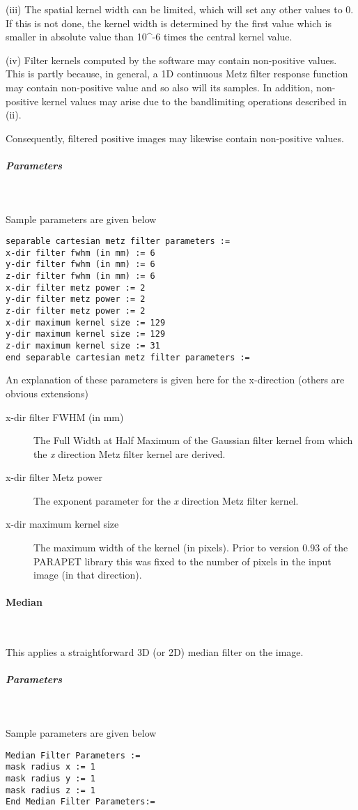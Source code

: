 \documentclass{article}
\newcommand{\subsubsubsection}[1]{\paragraph{#1}\mbox{} \\}
\newcommand{\subsubsubsubsection}[1]{\subparagraph{#1} \mbox{} \\}
\begin{document}
{(iii) The spatial kernel width can be limited, which will set 
any other values to 0. If this is not done, the kernel width 
is determined by the first value which is smaller in absolute 
value than 10{\textasciicircum}-6 times the central kernel value.



(iv) Filter kernels computed by the software may contain non-positive 
values. This is partly because, in general, a 1D continuous Metz 
filter response function may contain non-positive value and so 
also will its samples. In addition, non-positive kernel values 
may arise due to the bandlimiting operations described in (ii). 



Consequently, filtered positive images may likewise contain non-positive 
values. 

{ \subsubsubsubsection{Parameters}
}
Sample parameters are given below
\begin{verbatim}
separable cartesian metz filter parameters :=
x-dir filter fwhm (in mm) := 6
y-dir filter fwhm (in mm) := 6
z-dir filter fwhm (in mm) := 6
x-dir filter metz power := 2
y-dir filter metz power := 2
z-dir filter metz power := 2
x-dir maximum kernel size := 129
y-dir maximum kernel size := 129
z-dir maximum kernel size := 31
end separable cartesian metz filter parameters := 
\end{verbatim}


An explanation of these parameters is given here for the x-direction 
(others are obvious extensions)
\begin{description}
\item[x-dir filter FWHM (in mm)]
The Full Width at Half Maximum of the Gaussian filter kernel 
from which the \textit{x} direction Metz filter kernel are derived.

\item[x-dir filter Metz power]
The exponent parameter for the \textit{x} direction Metz filter kernel.

\item[x-dir maximum kernel size]
The maximum width of the kernel (in pixels). Prior to version 
0.93 of the PARAPET library this was fixed to the number of pixels 
in the input image (in that direction).
\end{description}

{ \subsubsubsection{Median}
}
\label{sec:median}
This applies a straightforward 3D (or 2D) median filter on the 
image.

{ \subsubsubsubsection{Parameters}
}
Sample parameters are given below
\begin{verbatim}
Median Filter Parameters := 
mask radius x := 1  
mask radius y := 1 
mask radius z := 1 
End Median Filter Parameters:=
\end{verbatim}


}
\end{document}
